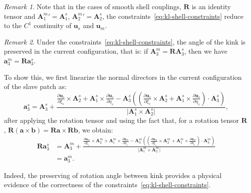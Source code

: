 \documentclass[preprint,12pt]{elsarticle}
\theoremstyle{remark}
\newtheorem{remark}{Remark}
\begin{document}
\begin{remark}
    Note that in the cases of smooth shell couplings, $\mathbf{R}$ is an identity tensor and ${\mathbf{A}_1^m}'={\mathbf{A}_1^s}$, ${\mathbf{A}_2^m}'={\mathbf{A}_2^s}$, the constraints~\eqref{eq:kl-shell-constraints} reduce to the $C^1$ continuity of $\mathbf{u}_s$ and $\mathbf{u}_m$.
\end{remark}
\begin{remark}\label{rm:angle-preservation}
    Under the constraints~\eqref{eq:kl-shell-constraints}, the angle of the kink is preserved in the current configuration, that is: if $\mathbf{A}_3^m=\mathbf{R}\mathbf{A}_3^s$, then we have $\mathbf{a}_3^m=\mathbf{R}\mathbf{a}_3^s$.\par

    To show this, we first linearize the normal directors in the current configuration of the slave patch as:
    \begin{equation}
        \mathbf{a}_3^s=\mathbf{A}_3^s+\frac{\frac{\partial\mathbf{u}_s}{\partial{\xi_s}}\times\mathbf{A}_2^s+\mathbf{A}_1^s\times\frac{\partial\mathbf{u}_s}{\partial{\eta_s}}-\mathbf{A}_3^s\left(\left({\frac{\partial\mathbf{u}_s}{\partial{\xi_s}}\times\mathbf{A}_2^s+\mathbf{A}_1^s\times\frac{\partial\mathbf{u}_s}{\partial{\eta_s}}}\right)\cdot\mathbf{A}_3^s\right)}{\vert{\mathbf{A}_1^s\times\mathbf{A}_2^s}\vert},
    \end{equation}
    after applying the rotation tensor and using the fact that, for a rotation tensor $\mathbf{R}$, $\mathbf{R}(\mathbf{a}\times\mathbf{b})=\mathbf{R}\mathbf{a}\times\mathbf{R}\mathbf{b}$, we obtain:
    \begin{equation}
        \begin{split}
            \mathbf{R}\mathbf{a}_3^s&=\mathbf{A}_3^m+\frac{\frac{\partial\mathbf{u}_m}{\partial{\xi_s}}\times\mathbf{A}_2^m+\mathbf{A}_1^m\times\frac{\partial\mathbf{u}_m}{\partial{\eta_s}}-\mathbf{A}_3^m\left(\left({\frac{\partial\mathbf{u}_m}{\partial{\xi_s}}\times\mathbf{A}_2^m+\mathbf{A}_1^m\times\frac{\partial\mathbf{u}_m}{\partial{\eta_s}}}\right)\cdot\mathbf{A}_3^m\right)}{\vert{\mathbf{A}_1^m\times\mathbf{A}_2^m}\vert}\\
            &=\mathbf{a}_3^m.
        \end{split}
    \end{equation}
\end{remark}

Indeed, the preserving of rotation angle between kink provides a physical evidence of the correctness of the constraints~\eqref{eq:kl-shell-constraints}.
\end{document}
